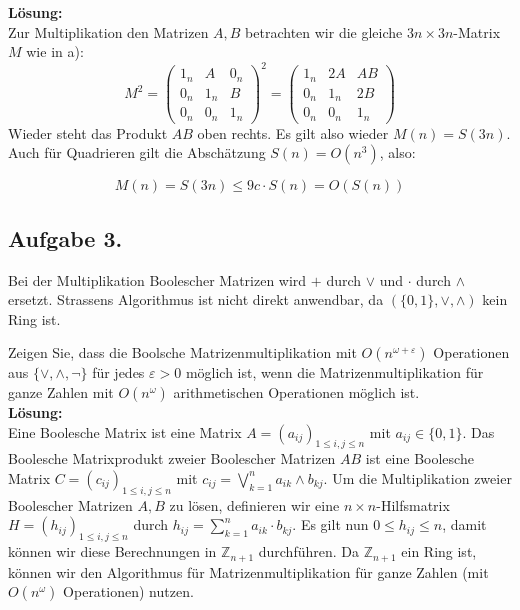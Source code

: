 \documentclass[11pt,a4paper,ngerman]{article}
\begin{document}
\textbf{Lösung:}\\
Zur Multiplikation den Matrizen $A,B$ betrachten wir die gleiche $3n \times 3n$-Matrix $M$ wie in a):
\begin{equation}\label{eq:square}
  M^{2} = \left(\begin{array}{ccc}
              1_n & A   & 0_n \\
              0_n & 1_n & B \\
              0_n & 0_n & 1_n
           \end{array}\right)^{2}
         = \left(\begin{array}{ccc}
              1_n & 2A   & AB \\
              0_n & 1_n & 2B \\
              0_n & 0_n & 1_n
           \end{array}\right)
\end{equation}
Wieder steht das Produkt $AB$ oben rechts. Es gilt also wieder $M(n) = S(3n)$. Auch für Quadrieren gilt
die Abschätzung $S(n) = O(n^3)$, also:

\begin{equation}
  M(n) = S(3n) {\leq} 9c\cdot S(n) = O(S(n))
\end{equation}


\subsection*{Aufgabe 3.}

Bei der Multiplikation Boolescher Matrizen wird $+$ durch $\lor$ und $\cdot$ durch $\land$ ersetzt. Strassens Algorithmus ist nicht direkt anwendbar, da $(\{0,1\}, \lor, \land)$ kein Ring ist.

Zeigen Sie, dass die Boolsche Matrizenmultiplikation mit $O( n^{\omega + \varepsilon} )$ Operationen aus $\{ \lor, \land, \neg \}$ für jedes $\varepsilon > 0$ möglich ist, wenn die Matrizenmultiplikation für ganze Zahlen mit $O(n^\omega )$ arithmetischen Operationen möglich ist.\\

\textbf{Lösung:}\\

Eine Boolesche Matrix ist eine Matrix $A = \left(a_{ij} \right)_{1 \leq i,j \leq n}$
mit $a_{ij} \in \{ 0,1 \}$. Das Boolesche Matrixprodukt zweier Boolescher Matrizen $AB$ ist eine
Boolesche Matrix $C = \left(c_{ij} \right)_{1 \leq i,j \leq n}$ mit 
$c_{ij} = \bigvee_{k = 1}^{n} a_{ik} \land b_{kj}$.
Um die Multiplikation zweier Boolescher Matrizen $A,B$ zu lösen,
definieren wir eine $n \times n$-Hilfsmatrix $H = \left(h_{ij} \right)_{1 \leq i,j \leq n}$ durch
$h_{ij} = \sum_{k=1}^{n} a_{ik}\cdot b_{kj}$. Es gilt nun $0 \leq h_{ij} \leq n$, damit können wir
diese Berechnungen in $\mathbb{Z}_{n+1}$  durchführen. Da $\mathbb{Z}_{n+1}$ ein Ring ist, können 
wir den Algorithmus für Matrizenmultiplikation für ganze Zahlen (mit $O(n^\omega)$ Operationen) nutzen.
\end{document}

